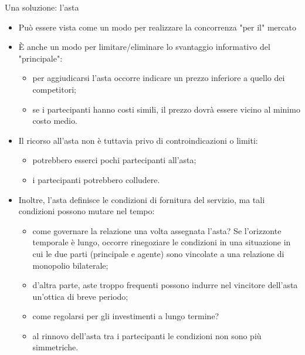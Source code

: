 \documentclass[aspectratio=149,11pt]{beamer}
\begin{document}
\begin{frame}{Una soluzione: l'asta}
\begin{itemize}
\item Può essere vista come un modo per realizzare la concorrenza "per il" mercato
\item È anche un modo per limitare/eliminare lo svantaggio informativo del "principale":
\begin{itemize}
\item per aggiudicarsi l'asta occorre indicare un prezzo inferiore a quello dei
competitori;
\item se i partecipanti hanno costi simili, il prezzo dovrà essere vicino al
minimo costo medio.
\end{itemize}
\item Il ricorso all'asta non è tuttavia privo di controindicazioni o limiti:
\begin{itemize}
\item potrebbero esserci pochi partecipanti all'asta;
\item i partecipanti potrebbero colludere.
\end{itemize}
\item Inoltre, l'asta definisce le condizioni di fornitura del servizio, ma tali
condizioni possono mutare nel tempo:
\begin{itemize}
\item come governare la relazione una volta assegnata l'asta? Se l'orizzonte
temporale è lungo, occorre rinegoziare le condizioni in una situazione in
cui le due parti (principale e agente) sono vincolate a una relazione di
monopolio bilaterale;
\item d'altra parte, aste troppo frequenti possono indurre nel vincitore
dell'asta un'ottica di breve periodo;
\item come regolarsi per gli investimenti a lungo termine?
\item al rinnovo dell'asta tra i partecipanti le condizioni non sono più
simmetriche.
\end{itemize}
\end{itemize}
\end{frame}
\end{document}
